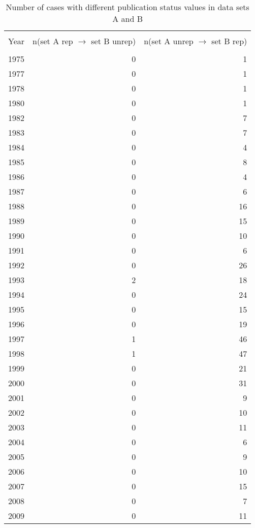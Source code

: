 \documentclass[10pt, letterpaper]{article}
\begin{document}
\begin{spacing}{1.0}
\vspace{-10pt}

\begin{table}[H]
    \centering
    \caption{Number of cases with different publication status values in data sets A and B}
    \footnotesize
    \begin{tabular}{lrr}
        \hline\\[-6pt]
        Year & n(set A rep $\rightarrow$ set B unrep) & n(set A unrep $\rightarrow$ set B rep)\\[4pt]
        \hline\\[-6pt]
        1975 & 0 & 1\\
        1977 & 0 & 1\\
        1978 & 0 & 1\\
        1980 & 0 & 1\\
        1982 & 0 & 7\\
        1983 & 0 & 7\\
        1984 & 0 & 4\\
        1985 & 0 & 8\\
        1986 & 0 & 4\\
        1987 & 0 & 6\\
        1988 & 0 & 16\\
        1989 & 0 & 15\\
        1990 & 0 & 10\\
        1991 & 0 & 6\\
        1992 & 0 & 26\\
        1993 & 2 & 18\\
        1994 & 0 & 24\\
        1995 & 0 & 15\\
        1996 & 0 & 19\\
        1997 & 1 & 46\\
        1998 & 1 & 47\\
        1999 & 0 & 21\\
        2000 & 0 & 31\\
        2001 & 0 & 9\\
        2002 & 0 & 10\\
        2003 & 0 & 11\\
        2004 & 0 & 6\\
        2005 & 0 & 9\\
        2006 & 0 & 10\\
        2007 & 0 & 15\\
        2008 & 0 & 7\\
        2009 & 0 & 11\\

\end{tabular}
\end{table}
\end{spacing}
\end{document}
